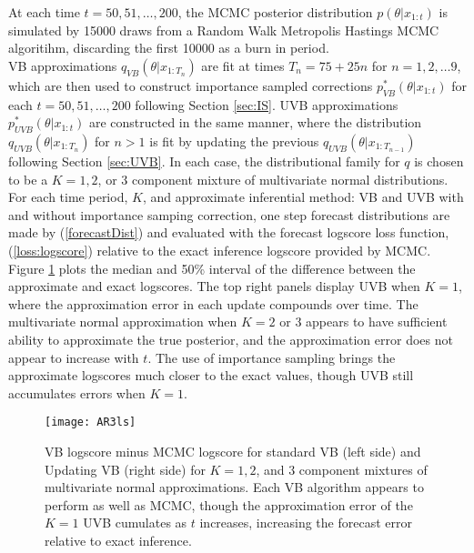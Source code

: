 \documentclass[12pt,a4paper]{article}\usepackage[]{graphicx}\usepackage[]{color}
\begin{document}
At each time $t = 50, 51, \dots, 200$, the MCMC posterior distribution $p(\theta | x_{1:t})$ is simulated by 15000 draws from a Random Walk Metropolis Hastings MCMC algoritihm, discarding the first 10000 as a burn in period.
\\

VB approximations $q_{VB}(\theta | x_{1:T_n})$ are fit at times $T_n = 75 + 25n$ for $n = 1, 2, \dots 9$, which are then used to construct importance sampled corrections $p^*_{VB}(\theta | x_{1:t})$ for each $t = 50, 51, \dots, 200$ following Section \ref{sec:IS}. UVB approximations $p^*_{UVB}(\theta | x_{1:t})$ are constructed in the same manner, where the distribution $q_{UVB}(\theta | x_{1:T_n})$ for $n >1$ is fit by updating the previous $q_{UVB}(\theta | x_{1:T_{n-1}})$ following Section \ref{sec:UVB}. In each case, the distributional family for $q$ is chosen to be a $K = 1, 2$, or $3$ component mixture of multivariate normal distributions.
\\

For each time period, $K$, and approximate inferential method: VB and UVB with and without importance samping correction, one step forecast distributions are made by (\ref{forecastDist}) and evaluated with the forecast logscore loss function, (\ref{loss:logscore}) relative to the exact inference logscore provided by MCMC. Figure \ref{fig:logscore} plots the median and 50\% interval of the difference between the approximate and exact logscores. The top right panels display UVB when $K = 1$, where the approximation error in each update compounds over time. The multivariate normal approximation when $K = 2$ or $3$ appears to have sufficient ability to approximate the true posterior, and the approximation error does not appear to increase with $t$. The use of importance sampling brings the approximate logscores much closer to the exact values, though UVB still accumulates errors when $K = 1$.

\begin{figure}
\centering
\texttt{[image: AR3ls]}
\caption{VB logscore minus MCMC logscore for standard VB (left side) and Updating VB (right side) for $K = 1, 2$, and $3$ component mixtures of multivariate normal approximations. Each VB algorithm appears to perform as well as MCMC, though the approximation error of the $K = 1$ UVB cumulates as $t$ increases, increasing the forecast error relative to exact inference.}
\label{fig:logscore}
\end{figure}
\end{document}
